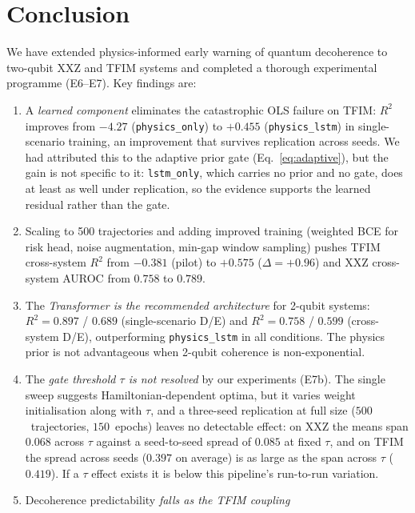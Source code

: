 \documentclass[twocolumn,10pt]{article}
\begin{document}
\section{Conclusion}

We have extended physics-informed early warning of quantum decoherence
to two-qubit XXZ and TFIM systems and completed a thorough experimental
programme (E6--E7).
Key findings are:
\begin{enumerate}
  \item A \emph{learned component} eliminates the catastrophic OLS
    failure on TFIM: $R^2$ improves from $-4.27$
    (\texttt{physics\_only}) to $+0.455$ (\texttt{physics\_lstm}) in
    single-scenario training, an improvement that survives replication
    across seeds.
    We had attributed this to the adaptive prior gate
    (Eq.~\ref{eq:adaptive}), but the gain is not specific to it:
    \texttt{lstm\_only}, which carries no prior and no gate, does at
    least as well under replication, so the evidence supports the
    learned residual rather than the gate.
  \item Scaling to 500 trajectories and adding improved training
    (weighted BCE for risk head, noise augmentation, min-gap window
    sampling) pushes TFIM cross-system $R^2$ from $-0.381$ (pilot) to
    $+0.575$ ($\Delta = +0.96$) and XXZ cross-system AUROC from $0.758$
    to $0.789$.
  \item The \emph{Transformer is the recommended architecture} for
    2-qubit systems: $R^2 = 0.897$ / $0.689$ (single-scenario D/E) and
    $R^2 = 0.758$ / $0.599$ (cross-system D/E), outperforming
    \texttt{physics\_lstm} in all conditions.
    The physics prior is not advantageous when 2-qubit coherence is
    non-exponential.
  \item The \emph{gate threshold $\tau$ is not resolved} by our
    experiments (E7b). The single sweep suggests Hamiltonian-dependent
    optima, but it varies weight initialisation along with $\tau$, and a
    three-seed replication at full size ($500$~trajectories,
    $150$~epochs) leaves no detectable effect: on XXZ the means span
    $0.068$ across $\tau$ against a seed-to-seed spread of $0.085$ at
    fixed $\tau$, and on TFIM the spread across seeds ($0.397$ on
    average) is as large as the span across $\tau$ ($0.419$).
    If a $\tau$ effect exists it is below this pipeline's run-to-run
    variation.
  \item Decoherence predictability \emph{falls as the TFIM coupling
}
\end{enumerate}
\end{document}
